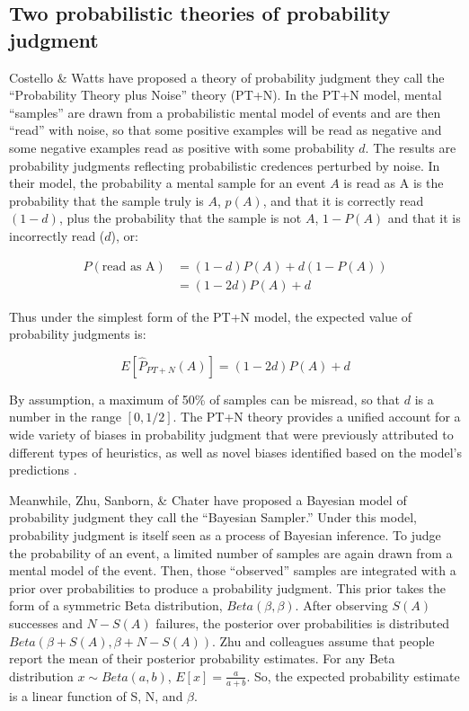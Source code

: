 \documentclass[
  english,
  man,floatsintext]{apa6}
\begin{document}
\hypertarget{two-probabilistic-theories-of-probability-judgment}{%
\subsection{Two probabilistic theories of probability judgment}\label{two-probabilistic-theories-of-probability-judgment}}

Costello \& Watts \autocite*{costello.watts2014,costello.watts2016,costello.watts2018} have proposed a theory of probability judgment they call the ``Probability Theory plus Noise'' theory (PT+N). In the PT+N model, mental ``samples'' are drawn from a probabilistic mental model of events and are then ``read'' with noise, so that some positive examples will be read as negative and some negative examples read as positive with some probability \(d\). The results are probability judgments reflecting probabilistic credences perturbed by noise. In their model, the probability a mental sample for an event \(A\) is read as A is the probability that the sample truly is \(A\), \(p(A)\), and that it is correctly read \((1-d)\), plus the probability that the sample is not \(A\), \(1-P(A)\) and that it is incorrectly read (\(d\)), or:

\begin{align*}
  P(\text{read as A}) &= (1-d)P(A) + d(1-P(A)) \\
  &= (1-2d)P(A) + d
\end{align*}

Thus under the simplest form of the PT+N model, the expected value of probability judgments is:

\[E[\hat{P}_{PT+N}(A)] = (1-2d)P(A) + d \]

By assumption, a maximum of 50\% of samples can be misread, so that \(d\) is a number in the range \([0, 1/2]\). The PT+N theory provides a unified account for a wide variety of biases in probability judgment that were previously attributed to different types of heuristics, as well as novel biases identified based on the model's predictions \autocite{costello.watts2014,costello.watts2016,costello.watts2017,costello.watts2018}.

Meanwhile, Zhu, Sanborn, \& Chater \autocite*{zhu.etal2020} have proposed a Bayesian model of probability judgment they call the ``Bayesian Sampler.'' Under this model, probability judgment is itself seen as a process of Bayesian inference. To judge the probability of an event, a limited number of samples are again drawn from a mental model of the event. Then, those ``observed'' samples are integrated with a prior over probabilities to produce a probability judgment. This prior takes the form of a symmetric Beta distribution, \(Beta(\beta, \beta)\). After observing \(S(A)\) successes and \(N - S(A)\) failures, the posterior over probabilities is distributed \(Beta(\beta + S(A), \beta + N - S(A))\). Zhu and colleagues \autocite*{zhu.etal2020} assume that people report the mean of their posterior probability estimates. For any Beta distribution \(x \sim Beta(a,b)\), \(E[x] = \frac{a}{a+b}\). So, the expected probability estimate is a linear function of S, N, and \(\beta\).
\end{document}
